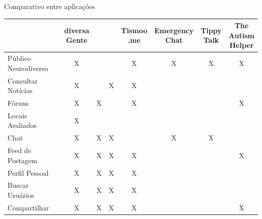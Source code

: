 \begin{quadro}[thb]
	\centering
	\ABNTEXfontereduzida
	\caption[Comparativo entre aplicações]{Comparativo entre aplicações}
	\label{tabela-comparativo}

	\begin{tabular}{|l|c|c|c|c|c|c|c|}
		\hline
		\thead{ } & \thead{diversa\\Gente} & \thead{Facebook}  & \thead{Twitter}  & \thead{Tismoo\\.me} & \thead{Emergency\\ Chat}  & \thead{Tippy\\ Talk}  & \thead{The \\Autism \\Helper}\\
		\hline
		Público Neurodiverso & X &  &  & X & X & X & X \\
		\hline
		Consultar Notícias & X &  & X & X &  &  &  \\
		\hline
		Fóruns & X & X &  & X &  &  & X \\
		\hline
		Locais Avaliados & X &  &  &  &  &  & \\
		\hline
		Chat & X & X & X &  & X & X &  \\
		\hline
		Feed de Postagem & X & X & X & X &  &  & X\\
		\hline
		Perfil Pessoal & X & X & X & X &  &  & \\
		\hline
		Buscar Usuários & X & X & X & X &  &  & \\
		\hline
		Compartilhar & X & X & X & X &  &  & X \\
		\hline
	\end{tabular}
\end{quadro}



